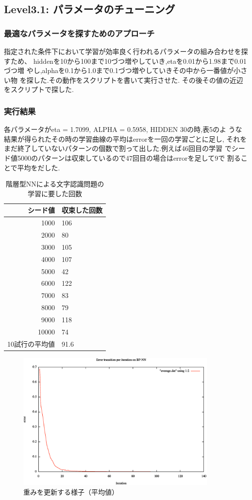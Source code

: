 \subsection{Level3.1: パラメータのチューニング}%
\subsubsection{最適なパラメータを探すためのアプローチ}
指定された条件下において学習が効率良く行われるパラメータの組み合わせを探
すため、
hiddenを10から100まで10づつ増やしていき,etaを0.01から1.98まで0.01づつ増
やし,alphaを0.1から1.0まで0.1づつ増やしていきその中から一番値が小さい物
を探した.その動作をスクリプトを書いて実行させた.
その後その値の近辺をスクリプトで探した.
\subsubsection{実行結果}
各パラメータがeta = 1.7099, ALPHA = 0.5958, HIDDEN 30の時,表5のよ
うな結果が得られたその時の学習曲線の平均はerrorを一回の学習ごとに足し,
それをまだ終了していないパターンの個数で割って出した.例えば46回目の学習
でシード値5000のパターンは収束しているので47回目の場合はerrorを足して9で
割ることで平均をだした.
\begin{table}[htb]
 \begin{center}
  \caption{階層型NNによる文字認識問題の学習に要した回数}
  \label{table:level3}
  \begin{tabular}[htb]{r|l} \hline
   シード値 & 収束した回数 \\ \hline \hline
   1000 & 106 \\ \hline
   2000 & 80 \\ \hline
   3000 & 105 \\ \hline
   4000 & 107 \\ \hline
   5000 & 42 \\ \hline
   6000 & 122 \\ \hline
   7000 & 83 \\ \hline
   8000 & 79 \\ \hline
   9000 & 118 \\ \hline
   10000 & 74 \\ \hline \hline
   10試行の平均値 & 91.6 \\ \hline
  \end{tabular}
 \end{center}
\end{table}

\begin{figure}[h]
 \begin{center}
  \includegraphics[width=10.0cm]{./figs/aver.eps}
  \caption{重みを更新する様子（平均値）}
  \label{fig:level2}
 \end{center}
\end{figure}
\newpage


